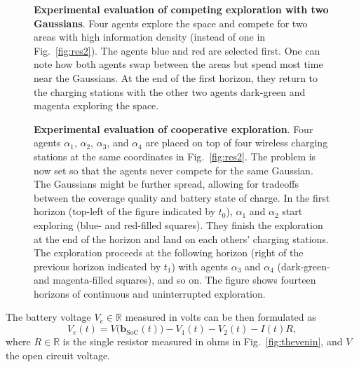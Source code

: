 \documentclass[letterpaper,10pt,conference,twoside]{IEEEtran}
\theoremstyle{definition}
\begin{document}
\begin{figure}[b!]
  \vspace*{-.3cm}
  \hspace*{-.2cm}
  
  \caption{\textbf{Experimental evaluation of %
  competing exploration with two Gaussians}. Four agents explore the space and compete for two areas with high information density (instead of one in Fig.~\ref{fig:res2}). The agents blue and red are selected first. One can note how both agents swap between the areas but spend most time near the Gaussians. At the end of the first horizon, they return to the charging stations with the other two agents dark-green and magenta exploring the space.}
  \label{fig:res3}
\end{figure}

\begin{figure*}[t!]
  \vspace*{.17cm}
  \begin{minipage}[t]{1\columnwidth}
    
  \end{minipage}
  \hspace{.42cm}
  \begin{minipage}[t]{.97\columnwidth}
    \vspace*{-4.2cm}
    \caption{\textbf{Experimental evaluation of cooperative exploration}. Four agents $\alpha_1$, $\alpha_2$, $\alpha_3$, and $\alpha_4$ are placed on top of four wireless charging stations at the same coordinates in Fig.~\ref{fig:res2}. The problem is now set so %
    that the agents never compete for the same Gaussian. The Gaussians might be further spread, allowing for tradeoffs between the coverage quality and battery state of charge. In the first horizon (top-left of the figure indicated by $t_0$), $\alpha_1$ and $\alpha_2$ start exploring (blue- and red-filled squares). They finish the exploration at the end of the horizon and land on each others' charging stations. The exploration proceeds at the following horizon (right of the previous horizon indicated by $t_1$) with agents $\alpha_3$ and $\alpha_4$ (dark-green- and magenta-filled squares), and so on. The figure shows fourteen horizons of continuous and uninterrupted exploration.}
    \label{fig:res}
  \end{minipage}
  \vspace*{-.6cm}
\end{figure*}

The battery voltage $V_e\in\mathbb{R}$ measured in volts can be then formulated as%
\begin{equation}\label{eq:battvolt}
  V_e(t)=V\big(\mathbf{b}_{\text{SoC}}(t)\big)-V_1(t)-V_2(t)-I(t)R,
\end{equation}
where $R\in\mathbb{R}$ is the single resistor measured in ohms in Fig.~\ref{fig:thevenin}, and $V$ the open circuit voltage. %
\end{document}
